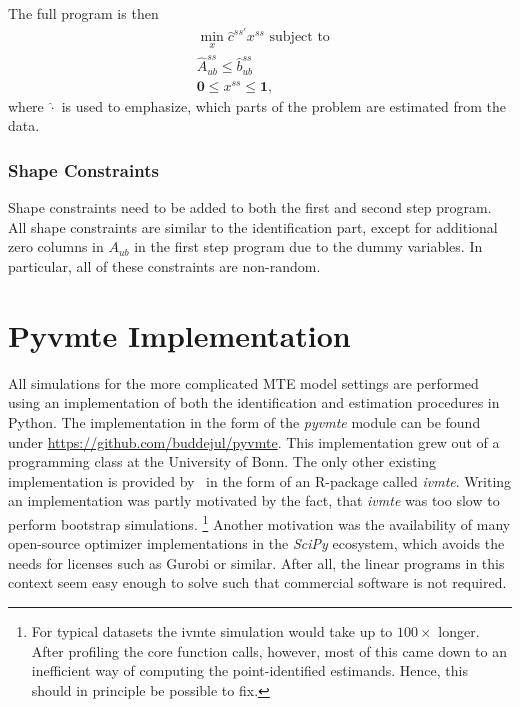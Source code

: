 \documentclass[12pt,a4paper,english]{article} %
\numberwithin{equation}{section}
\theoremstyle{definition}
\theoremstyle{remark}
\theoremstyle{plain}
\begin{document}
The full program is then
\begin{align}
  & \min_x \hat{c}^{ss'}x^{ss} \text{ subject to }\\
  & \hat{A}_{ub}^{ss} \leq \hat{b}_{ub}^{ss} \\
  & \mathbf{0} \leq x^{ss} \leq \mathbf{1},
\end{align}
where $\hat{\cdot}$ is used to emphasize, which parts of the problem are estimated from the data.

\subsubsection{Shape Constraints}
Shape constraints need to be added to both the first and second step program.
All shape constraints are similar to the identification part, except for additional zero columns in $A_{ub}$ in the first step program due to the dummy variables.
In particular, all of these constraints are non-random.

\clearpage
\newpage

\section{Pyvmte Implementation}
All simulations for the more complicated MTE model settings are performed using an implementation of both the identification and estimation procedures in Python.
The implementation in the form of the \textit{pyvmte} module can be found under \url{https://github.com/buddejul/pyvmte}.
This implementation grew out of a programming class at the University of Bonn.
The only other existing implementation is provided by~\cite{shea2023ivmte} in the form of an R-package called \textit{ivmte}.
Writing an implementation was partly motivated by the fact, that \textit{ivmte} was too slow to perform bootstrap simulations.
\footnote{For typical datasets the ivmte simulation would take up to $100\times$ longer.
After profiling the core function calls, however, most of this came down to an inefficient way of computing the point-identified estimands.
Hence, this should in principle be possible to fix.}
Another motivation was the availability of many open-source optimizer implementations in the \textit{SciPy} ecosystem, which avoids the needs for licenses such as Gurobi or similar.
After all, the linear programs in this context seem easy enough to solve such that commercial software is not required.
\end{document}
